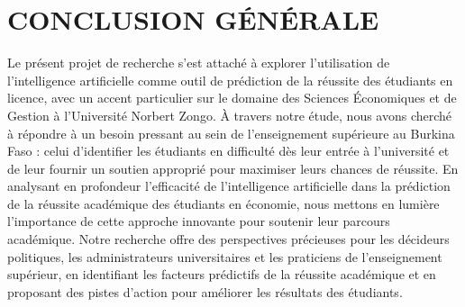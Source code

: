 \chapter*{CONCLUSION GÉNÉRALE}
\adjustmtc
\thispagestyle{MyStyle}

Le présent projet de recherche s'est attaché à explorer l'utilisation de l'intelligence artificielle comme outil de prédiction de la réussite des étudiants en licence, avec un accent particulier sur le domaine des Sciences Économiques et de Gestion à l'Université Norbert Zongo. À travers notre étude, nous avons cherché à répondre à un besoin pressant au sein de l'enseignement supérieure au Burkina Faso : celui d'identifier les étudiants en difficulté dès leur entrée à l'université et de leur fournir un soutien approprié pour maximiser leurs chances de réussite.
En analysant en profondeur l'efficacité de l'intelligence artificielle dans la prédiction de la réussite académique des étudiants en économie, nous mettons en lumière l'importance de cette approche innovante pour soutenir leur parcours académique. Notre recherche offre des perspectives précieuses pour les décideurs politiques, les administrateurs universitaires et les praticiens de l'enseignement supérieur, en identifiant les facteurs prédictifs de la réussite académique et en proposant des pistes d'action pour améliorer les résultats des étudiants.